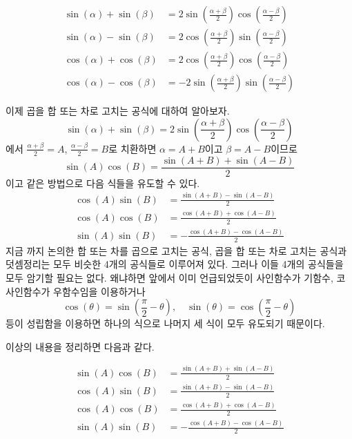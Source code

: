 \documentclass[11pt, a4paper]{book}
\begin{document}
\begin{theorem}
	\vspace{-2em}
	\begin{align*}
		\sin(\alpha) + \sin(\beta) & = 2 \sin\left(\frac{\alpha+\beta}{2}\right) \cos\left(\frac{\alpha-\beta}{2}\right)\\
		\sin(\alpha) - \sin(\beta)  &=  2 \cos\left(\frac{\alpha+\beta}{2}\right) \sin\left(\frac{\alpha-\beta}{2}\right)\\
		\cos(\alpha) +\cos(\beta) &= 2 \cos\left(\frac{\alpha+\beta}{2}\right) \cos\left(\frac{\alpha-\beta}{2}\right)\\
		\cos(\alpha) -\cos(\beta) &= -2 \sin\left(\frac{\alpha+\beta}{2}\right) \sin\left(\frac{\alpha-\beta}{2}\right)
	\end{align*}
\end{theorem}
이제 곱을 합 또는 차로 고치는 공식에 대하여 알아보자.
\[
\sin(\alpha) + \sin(\beta)  = 2 \sin\left(\frac{\alpha+\beta}{2}\right) \cos\left(\frac{\alpha-\beta}{2}\right)
\]
에서 $\frac{\alpha+\beta}{2}=A$, $\frac{\alpha-\beta}{2}=B$로 치환하면
$\alpha=A+B$이고 $\beta = A-B$이므로
\[
\sin(A) \cos(B) = \frac{\sin(A+B)+\sin(A-B)}{2}
\]
이고 같은 방법으로 다음 식들을 유도할 수 있다.
\begin{align*}
	\cos(A)\sin(B) &=\frac{\sin(A+B)-\sin(A-B)}{2} \\
	\cos(A)\cos(B) &=\frac{\cos(A+B)+\cos(A-B)}{2} \\
	\sin(A)\sin(B) &=-\frac{\cos(A+B)-\cos(A-B)}{2} 
\end{align*}
 지금 까지 논의한 합 또는 차를 곱으로 고치는 공식, 곱을 합 또는 차로 고치는 공식과 덧셈정리는 모두 비슷한 4개의 공식들로 이루어져 있다. 그러나 이들 4개의 공식들을 모두 암기할 필요는 없다. 왜냐하면 앞에서 이미 언급되었듯이 사인함수가 기함수, 코사인함수가 우함수임을 이용하거나
 \[
 \cos(\theta) =\sin\left(\frac{\pi}{2}-\theta\right), \quad \sin(\theta) =\cos\left(\frac{\pi}{2}-\theta\right)
 \]
 등이 성립함을 이용하면 하나의 식으로 나머지 세 식이 모두 유도되기 때문이다.
 
 
이상의 내용을 정리하면 다음과 같다.

\begin{theorem}[곱을 합 또는 차로 고치는 공식]\vspace{-2em}
 \begin{align*}
 	\sin(A)\cos(B) &=\frac{\sin(A+B)+\sin(A-B)}{2}\\
 	\cos(A)\sin(B) &=\frac{\sin(A+B)-\sin(A-B)}{2}\\
 	\cos(A)\cos(B) &=\frac{\cos(A+B)+\cos(A-B)}{2}\\
 	\sin(A)\sin(B) &=-\frac{\cos(A+B)-\cos(A-B)}{2} 
 \end{align*}	
\end{theorem}
\end{document}
